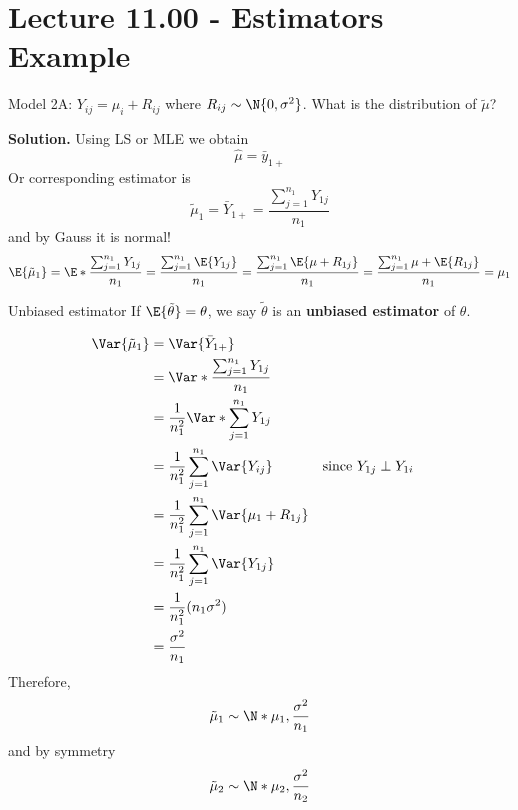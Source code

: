 \section{Lecture 11.00 - Estimators Example}
\begin{Example}{}{}
    Model 2A\@: $ Y_{ij}=\mu_i+R_{ij} $ where $ R_{ij} \sim \N{0,\sigma^2} $.
    What is the distribution of $ \tilde{\mu} $?

    \textbf{Solution.} Using LS or MLE we obtain
    \[ \hat{\mu}=\bar{y}_{1+} \]
    Or corresponding estimator is
    \[ \tilde{\mu}_1=\bar{Y}_{1+}=\frac{\sum_{j=1}^{n_1}Y_{1j}}{n_1}  \]
    and by Gauss it is normal!
    \[
        \E{\tilde{\mu}_1}
        =\E*{\frac{\sum_{j=1}^{n_1} Y_{1j}}{n_1}}
        =\frac{\sum_{j=1}^{n_1}\E{Y_{1j}}}{n_1}
        =\frac{\sum_{j=1}^{n_1} \E{\mu+R_{1j}}}{n_1}
        =\frac{\sum_{j=1}^{n_1} \mu+\E{R_{1j}}}{n_1}
        =\mu_1
    \]
    \begin{Definition}{Unbiased estimator}{}
        If $ \E{\tilde{\theta}}=\theta $, we say $ \tilde{\theta} $
        is an \textbf{unbiased estimator} of $ \theta $.
    \end{Definition}
    \begin{align*}
        \Var{\tilde{\mu}_1}
         & =\Var{\bar{Y}_{1+}}                                                                       \\
         & =\Var*{\frac{\sum_{j=1}^{n_1} Y_{1j}}{n_1} }                                              \\
         & =\frac{1}{n_1^2}\Var*{\sum_{j=1}^{n_1} Y_{1j}}                                            \\
         & =\frac{1}{n_1^2} \sum_{j=1}^{n_1} \Var{Y_{ij}}       &  & \text{since }Y_{1j}\perp Y_{1i} \\
         & =\frac{1}{n_1^2} \sum_{j=1}^{n_1} \Var{\mu_1+R_{1j}}                                      \\
         & =\frac{1}{n_1^2} \sum_{j=1}^{n_1} \Var{Y_{1j}}                                            \\
         & =\frac{1}{n_1^2} (n_1\sigma^2)                                                            \\
         & =\frac{\sigma^2}{n_1}
    \end{align*}
    Therefore,
    \[ \tilde{\mu}_1\sim \N*{\mu_1,\frac{\sigma^2}{n_1}} \]
    and by symmetry
    \[ \tilde{\mu}_2 \sim \N*{\mu_2,\frac{\sigma^2}{n_2}} \]
\end{Example}
